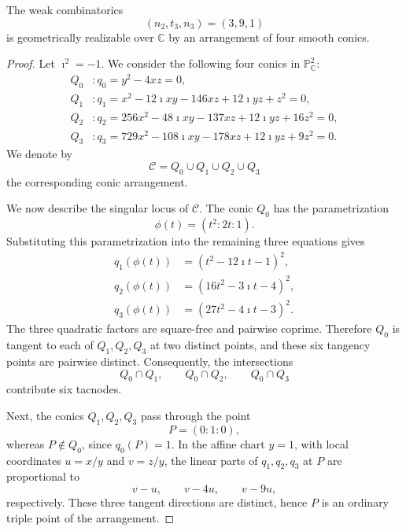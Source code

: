 \documentclass[10pt,a4paper]{amsart}
\begin{document}
\begin{proposition}
\label{391}
The weak combinatorics
\[
        (n_2,t_3,n_3)=(3,9,1)
\]
is geometrically realizable over \(\mathbb C\) by an arrangement of four smooth conics.
\end{proposition}

\begin{proof}
Let \(\imath^2=-1\). We consider the following four conics in
\(\mathbb P^2_{\mathbb C}\):
\[
\begin{aligned}
Q_0&: q_0=y^2-4xz=0,\\
Q_1&: q_1=x^2-12\imath xy-146xz+12\imath yz+z^2=0,\\
Q_2&: q_2=256x^2-48\imath xy-137xz+12\imath yz+16z^2=0,\\
Q_3&: q_3=729x^2-108\imath xy-178xz+12\imath yz+9z^2=0.
\end{aligned}
\]
We denote by
\[
        \mathcal C=Q_0\cup Q_1\cup Q_2\cup Q_3
\]
the corresponding conic arrangement.

\noindent
We now describe the singular locus of \(\mathcal C\). The conic \(Q_0\)
has the parametrization
\[
        \phi(t)=(t^2:2t:1).
\]
Substituting this parametrization into the remaining three equations gives
\[
\begin{aligned}
q_1(\phi(t))&=(t^2-12\imath t-1)^2,\\
q_2(\phi(t))&=(16t^2-3\imath t-4)^2,\\
q_3(\phi(t))&=(27t^2-4\imath t-3)^2.
\end{aligned}
\]
The three quadratic factors are square-free and pairwise coprime. Therefore
\(Q_0\) is tangent to each of \(Q_1,Q_2,Q_3\) at two distinct points, and these
six tangency points are pairwise distinct. Consequently, the intersections
\[
        Q_0\cap Q_1,\qquad Q_0\cap Q_2,\qquad Q_0\cap Q_3
\]
contribute six tacnodes.

Next, the conics \(Q_1,Q_2,Q_3\) pass through the point
\[
        P=(0:1:0),
\]
whereas \(P\notin Q_0\), since \(q_0(P)=1\). In the affine chart \(y=1\),
with local coordinates \(u=x/y\) and \(v=z/y\), the linear parts of
\(q_1,q_2,q_3\) at \(P\) are proportional to
\[
        v-u,\qquad v-4u,\qquad v-9u,
\]
respectively. These three tangent directions are distinct, hence \(P\) is an
ordinary triple point of the arrangement.


\end{proof}
\end{document}
